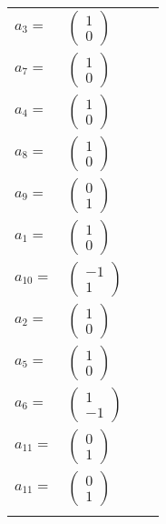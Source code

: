 \documentclass[1p]{elsarticle_modified}
\theoremstyle{definition}
\begin{document}
\begin{tabular}{m{7pt} m{180pt} m{7pt} m{180pt} }
\flushright $a_{3}=$&$\begin{pmatrix}1\\0\end{pmatrix}$ \\
\flushright $a_{7}=$&$\begin{pmatrix}1\\0\end{pmatrix}$ \\
\flushright $a_{4}=$&$\begin{pmatrix}1\\0\end{pmatrix}$ \\
\flushright $a_{8}=$&$\begin{pmatrix}1\\0\end{pmatrix}$ \\
\flushright $a_{9}=$&$\begin{pmatrix}0\\1\end{pmatrix}$ \\
\flushright $a_{1}=$&$\begin{pmatrix}1\\0\end{pmatrix}$ \\
\flushright $a_{10}=$&$\begin{pmatrix}-1\\1\end{pmatrix}$ \\
\flushright $a_{2}=$&$\begin{pmatrix}1\\0\end{pmatrix}$ \\
\flushright $a_{5}=$&$\begin{pmatrix}1\\0\end{pmatrix}$ \\
\flushright $a_{6}=$&$\begin{pmatrix}1\\-1\end{pmatrix}$ \\
\flushright $a_{11}=$&$\begin{pmatrix}0\\1\end{pmatrix}$\\ \flushright $a_{11}=$&$\begin{pmatrix}0\\1\end{pmatrix}$\\&\end{tabular}
\end{document}
